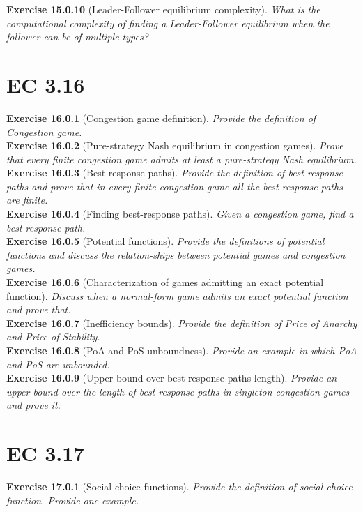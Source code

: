 \textbf{Exercise 15.0.10} (Leader-Follower equilibrium complexity). \textit{What is the computational complexity of finding a Leader-Follower equilibrium when the follower can be of multiple types?}\\

\section{EC 3.16}

\textbf{Exercise 16.0.1} (Congestion game definition). \textit{Provide the definition of Congestion game.}\\

\textbf{Exercise 16.0.2} (Pure-strategy Nash equilibrium in congestion games). \textit{Prove that every finite congestion game admits at least a pure-strategy Nash equilibrium.}\\

\textbf{Exercise 16.0.3} (Best-response paths). \textit{Provide the definition of best-response paths and prove that in every finite congestion game all the best-response paths are finite.}\\

\textbf{Exercise 16.0.4} (Finding best-response paths). \textit{Given a congestion game, find a best-response path.}\\

\textbf{Exercise 16.0.5} (Potential functions). \textit{Provide the definitions of potential functions and discuss the relation-ships between potential games and congestion games.}\\

\textbf{Exercise 16.0.6} (Characterization of games admitting an exact potential function). \textit{Discuss when a normal-form game admits an exact potential function and prove that.}\\

\textbf{Exercise 16.0.7} (Inefficiency bounds). \textit{Provide the definition of Price of Anarchy and Price of Stability.}\\

\textbf{Exercise 16.0.8} (PoA and PoS unboundness). \textit{Provide an example in which PoA and PoS are unbounded.}\\

\textbf{Exercise 16.0.9} (Upper bound over best-response paths length). \textit{Provide an upper bound over the length of best-response paths in singleton congestion games and prove it.}

\section{EC 3.17}
\textbf{Exercise 17.0.1} (Social choice functions). \textit{Provide the definition of social choice function. Provide one example.}\\

